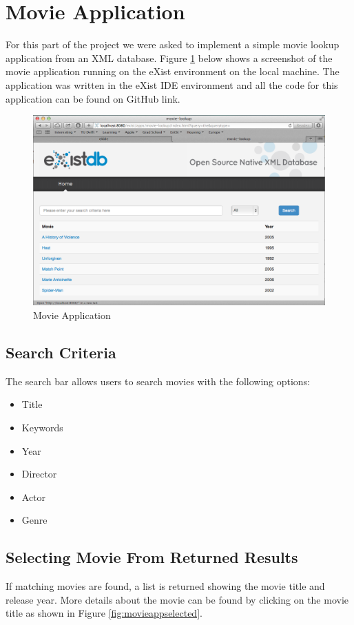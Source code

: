 \documentclass[MoviesApp.tex]{subfiles}
\begin{document}
\section{Movie Application}

For this part of the project we were asked to implement a simple movie lookup application from an XML database. Figure \ref{fig:movieapp} below shows a screenshot of the movie application running on the eXist environment on the local machine. The application was written in the eXist IDE environment and all the code for this application can be found on GitHub link.

\begin{figure}[H]
	\centering
	\includegraphics[width=1\textwidth]{./Figures/MovieApp.png}
	\caption{Movie Application}
	\label{fig:movieapp}
\end{figure}

\subsection{Search Criteria}
The search bar allows users to search movies with the following options:

\begin{itemize}
\item Title
\item Keywords
\item Year
\item Director
\item Actor
\item Genre
\end{itemize}

\subsection{Selecting Movie From Returned Results}
If matching movies are found, a list is returned showing the movie title and release year. More details about the movie can be found by clicking on the movie title as shown in Figure \ref{fig:movieappselected}.
\end{document}
